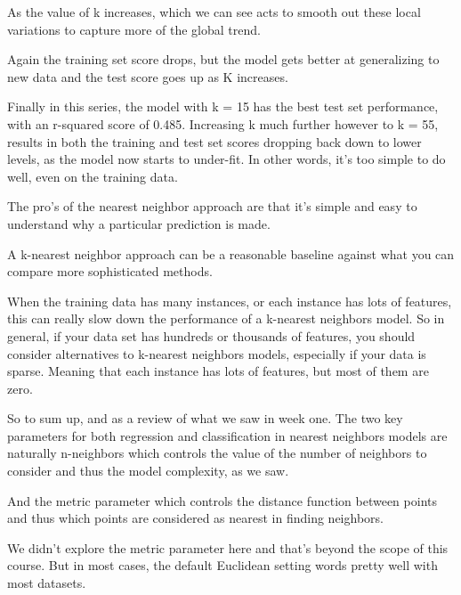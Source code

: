 \begin{multicols}{2}
As the value of k increases, which we can see acts to smooth out these local variations to capture more of the global trend. 

Again the training set score drops, but the model gets better at generalizing to new data and the test score goes up as K increases. 

Finally in this series, the model with k = 15 has the best test set performance, with an r-squared score of 0.485. Increasing k much further however to k = 55, results in both the training and test set scores dropping back down to lower levels, as the model now starts to under-fit. In other words, it's too simple to do well, even on the training data. 

The pro's of the nearest neighbor approach are that it's simple and easy to understand why a particular prediction is made. 

A k-nearest neighbor approach can be a reasonable baseline against what you can compare more sophisticated methods. 

When the training data has many instances, or each instance has lots of features, this can really slow down the performance of a k-nearest neighbors model. So in general, if your data set has hundreds or thousands of features, you should consider alternatives to k-nearest neighbors models, especially if your data is sparse. Meaning that each instance has lots of features, but most of them are zero. 

So to sum up, and as a review of what we saw in week one. The two key parameters for both regression and classification in nearest neighbors models are naturally n-neighbors which controls the value of the number of neighbors to consider and thus the model complexity, as we saw. 

And the metric parameter which controls the distance function between points and thus which points are considered as nearest in finding neighbors. 

We didn't explore the metric parameter here and that's beyond the scope of this course. But in most cases, the default Euclidean setting words pretty well with most datasets. 

\end{multicols}